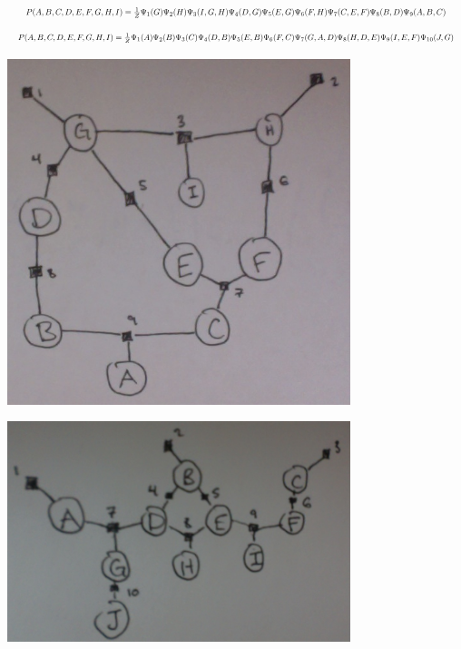 \documentclass[solution, letterpaper]{cs121}
\begin{document}
\begin{empfile}
\subproblem \\%
\begin{equation*}
\resizebox{1\hsize}{!}{$P(A,B,C,D,E,F,G,H,I) = \frac{1}{Z}\Psi_1(G)\Psi_2(H)\Psi_3(I,G,H)\Psi_4(D,G)\Psi_5(E,G)\Psi_6(F,H)\Psi_7(C,E,F)\Psi_8(B,D)\Psi_9(A,B,C)$}
\end{equation*}
\begin{equation*}
\resizebox{1\hsize}{!}{$P(A,B,C,D,E,F,G,H,I) = \frac{1}{Z}\Psi_1(A)\Psi_2(B)\Psi_3(C)\Psi_4(D,B)\Psi_5(E,B)\Psi_6(F,C)\Psi_7(G,A,D)\Psi_8(H,D,E)\Psi_9(I,E,F)\Psi_{10}(J,G)$}
\end{equation*}
\subproblem %
\begin{center}
\includegraphics[width=100mm]{factor_graph_a.png}
\end{center}

\begin{center}
\includegraphics[width=100mm]{factor_graph_b.png}
\end{center}


\end{empfile}
\end{document}
